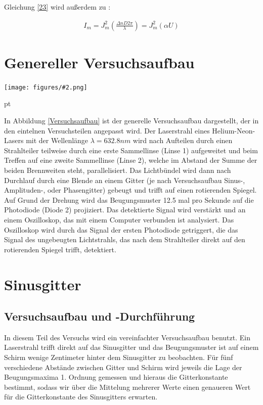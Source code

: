 \documentclass[12pt]{article}
\newcommand{\gra}[3][0.7]{
	\begin{minipage}[h!]{\textwidth}
		\centering
		\texttt{[image: figures/\#2.png]}
		\captionof{figure}{#3}
	\end{minipage}
	\vskip 30 pt
}
\begin{document}
Gleichung \ref{23} wird außerdem zu \cite{rana}:

\begin{align}
I_m = J_m^2 \left( \frac{\Delta n D 2 \pi}{\lambda} \right) = J_m^2\left(\alpha U \right) 
\end{align}
\newpage
\section{Genereller Versuchsaufbau} \label{Aufbau}

\gra[1]{Versuchsaufbau}{Versuchsaufbau \label{Versuchsaufbau} \cite{anleitung}}

In Abbildung \ref{Versuchsaufbau} ist der generelle Versuchsaufbau dargestellt, der in den eintelnen Versuchsteilen angepasst wird.
Der Laserstrahl eines Helium-Neon-Lasers mit der Wellenlänge $\lambda = 632.8 nm$ wird nach Aufteilen durch einen Strahlteiler  teilweise durch eine erste Sammellinse (Linse 1) aufgeweitet und beim Treffen auf eine zweite Sammellinse (Linse 2), welche im Abstand der Summe der beiden Brennweiten steht, parallelisiert. Das Lichtbündel wird dann nach Durchlauf durch eine Blende an einem Gitter (je nach Versuchsaufbau Sinus-, Amplituden-, oder Phasengitter) gebeugt und trifft auf einen rotierenden Spiegel. Auf Grund der Drehung wird das Beugungsmuster 12.5 mal pro Sekunde auf die Photodiode (Diode 2) projiziert. Das detektierte Signal wird verstärkt und an einem Oszilloskop, das mit einem Computer verbunden ist analysiert. Das Oszilloskop wird durch das Signal der ersten Photodiode getriggert, die das Signal des ungebeugten Lichtstrahls, das nach dem Strahlteiler direkt auf den rotierenden Spiegel trifft, detektiert.

\newpage

\section{Sinusgitter}



\subsection{Versuchsaufbau und -Durchführung}

In diesem Teil des Versuchs wird ein vereinfachter Versuchsaufbau benutzt. Ein Laserstrahl trifft direkt auf das Sinusgitter und das Beugungsmuster ist auf einem Schirm wenige Zentimeter hinter dem Sinusgitter zu beobachten. Für fünf verschiedene Abstände zwischen Gitter und Schirm wird jeweils die Lage der Beugungsmaxima 1. Ordnung gemessen und hieraus die Gitterkonstante bestimmt, sodass wir über die Mittelung mehrerer Werte einen genaueren Wert für die Gitterkonstante des Sinusgitters erwarten.
\end{document}
